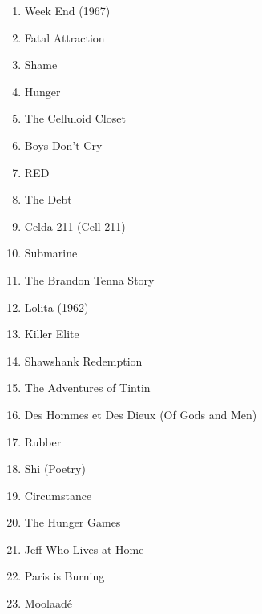 \documentclass[11pt]{article}
\begin{document}
\begin{enumerate}
\item Week End (1967)
\item Fatal Attraction
\item Shame
\item Hunger
\item The Celluloid Closet
\item Boys Don't Cry
\item RED
\item The Debt
\item Celda 211 (Cell 211)
\item Submarine
\item The Brandon Tenna Story
\item Lolita (1962)
\item Killer Elite
\item Shawshank Redemption
\item The Adventures of Tintin
\item Des Hommes et Des Dieux (Of Gods and Men)
\item Rubber
\item Shi (Poetry)
\item Circumstance
\item The Hunger Games
\item Jeff Who Lives at Home
\item Paris is Burning
\item Moolaadé
\end{enumerate}
\end{document}
